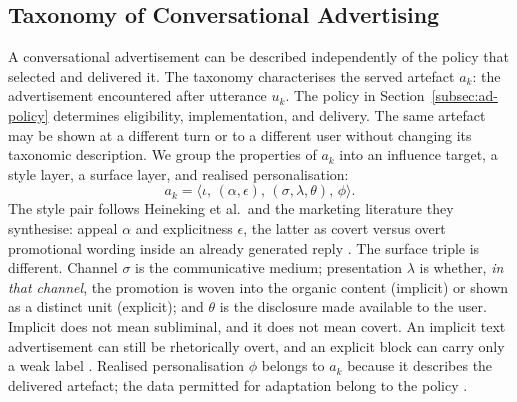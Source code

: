 \documentclass[english]{article}
\begin{document}
\subsection{Taxonomy of Conversational Advertising}
\label{subsec:ad-taxonomy}
A conversational advertisement can be described independently of the
policy that selected and delivered it. The taxonomy characterises the
served artefact \(a_k\): the advertisement encountered after utterance
\(u_k\). The policy in Section~\ref{subsec:ad-policy} determines
eligibility, implementation, and delivery. The same artefact may be
shown at a different turn or to a different user without changing its
taxonomic description.
We group the properties of \(a_k\) into an influence target, a style
layer, a surface layer, and realised personalisation:
\begin{equation}
    a_k = \bigl\langle \iota,\,(\alpha,\epsilon),\,(\sigma,\lambda,\theta),\,\phi \bigr\rangle.
    \label{eq:ad-instance}
\end{equation}
The style pair follows Heineking et al.\ and the marketing literature
they synthesise: appeal \(\alpha\) and explicitness \(\epsilon\), the
latter as covert versus overt promotional wording inside an already
generated reply \cite{heineking2026detecting}. The surface triple is
different. Channel \(\sigma\) is the communicative medium; presentation
\(\lambda\) is whether, \emph{in that channel}, the promotion is woven into
the organic content (implicit) or shown as a distinct unit (explicit);
and \(\theta\) is the disclosure made available to the user. Implicit
does not mean subliminal, and it does not mean covert. An implicit text
advertisement can still be rhetorically overt, and an explicit block can
carry only a weak label
\cite{tang2025adstalkbackimplications}. Realised personalisation
\(\phi\) belongs to \(a_k\) because it describes the delivered artefact;
the data permitted for adaptation belong to the policy
\cite{jannach2021crs,meguellati2025llmads}.
\end{document}
